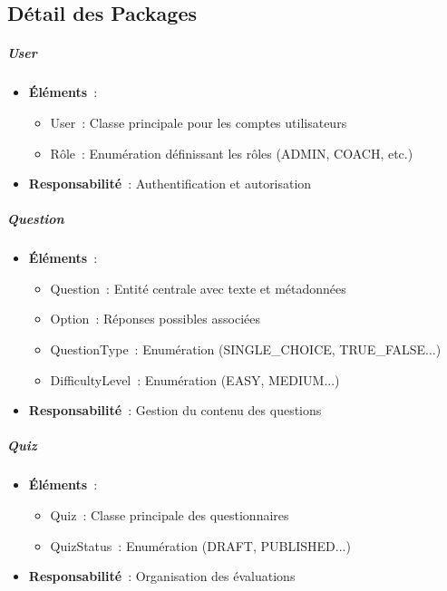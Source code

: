 \documentclass[12pt,a4paper,twoside]{report}
\begin{document}
\hypertarget{duxe9tail-des-packages}{%
\subsection{Détail des Packages}\label{duxe9tail-des-packages}}

\hypertarget{user}{%
\subparagraph{User}\label{user}}

\begin{itemize}
\item
  \textbf{Éléments}~:

  \begin{itemize}
  \item
    User~: Classe principale pour les comptes utilisateurs
  \item
    Rôle~: Enumération définissant les rôles (ADMIN, COACH, etc.)
  \end{itemize}
\item
  \textbf{Responsabilité}~: Authentification et autorisation
\end{itemize}

\hypertarget{question}{%
\subparagraph{Question}\label{question}}

\begin{itemize}
\item
  \textbf{Éléments}~:

  \begin{itemize}
  \item
    Question~: Entité centrale avec texte et métadonnées
  \item
    Option~: Réponses possibles associées
  \item
    QuestionType~: Enumération (SINGLE\_CHOICE, TRUE\_FALSE...)
  \item
    DifficultyLevel~: Enumération (EASY, MEDIUM...)
  \end{itemize}
\item
  \textbf{Responsabilité}~: Gestion du contenu des questions
\end{itemize}

\hypertarget{quiz}{%
\subparagraph{Quiz}\label{quiz}}

\begin{itemize}
\item
  \textbf{Éléments}~:

  \begin{itemize}
  \item
    Quiz~: Classe principale des questionnaires
  \item
    QuizStatus~: Enumération (DRAFT, PUBLISHED...)
  \end{itemize}
\item
  \textbf{Responsabilité}~: Organisation des évaluations
\end{itemize}
\end{document}
